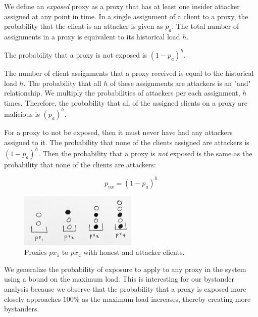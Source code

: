 We define an \textit{exposed} proxy as a proxy that has at least one insider attacker assigned at any point in time. In a single assignment of a client to a proxy, the probability that the client is an attacker is given as $p_a$. The total number of assignments in a proxy is equivalent to its historical load $h$. 

\begin{lemma}{The probability that a proxy is not exposed is $(1-p_a)^{h}$.}

The number of client assignments that a proxy received is equal to the historical load $h$. The probability that all $h$ of these assignments are attackers is an "and" relationship. We multiply the probabilities of attackers per each assignment, $h$ times. Therefore, the probability that all of the assigned clients on a proxy are malicious is $(p_a)^h$. 

For a proxy to not be exposed, then it must never have had any attackers assigned to it. The probability that none of the clients assigned are attackers is $(1-p_a)^h$. Then the probability that a proxy is \textit{not} exposed is the same as the probability that none of the clients are attackers:

$$p_{nx} = (1-p_a)^h$$

\end{lemma}

\begin{figure}[h!]
\centering
     \includegraphics[width=0.5\textwidth]{fig/bystander_draw.png}
    \caption{Proxies $px_1$ to $px_4$ with honest and attacker clients.}

    \label{fig:bystandersdraw}
\end{figure}

We generalize the probability of exposure to apply to any proxy in the system using a bound on the maximum load. This is interesting for our bystander analysis because we observe that the probability that a proxy is exposed more closely approaches $100\%$ as the maximum load increases, thereby creating more bystanders.

